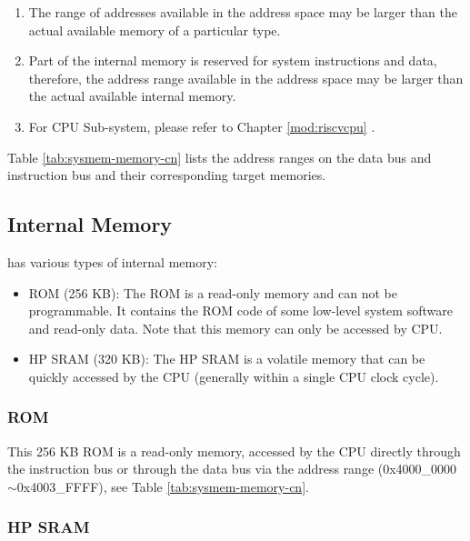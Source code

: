 \documentclass[main\_\_EN.tex]{subfiles}
\begin{document}
\begin{tiplisting}
\vspace{-2em}
\begin{enumerate}
    \item The range of addresses available in the address space may be larger than the actual available memory of a particular type.
    \item Part of the internal memory is reserved for system instructions and data, therefore, the address range available in the address space may be larger than the actual available internal memory.
    \item For CPU Sub-system, please refer to Chapter \ref{mod:riscvcpu} \textit{}.
\end{enumerate}
\end{tiplisting}

Table \ref{tab:sysmem-memory-cn} lists the address ranges on the data bus and instruction bus and their corresponding target memories.




\subsection{Internal Memory}
\label{para:sysmem-internal-memory}

\chipname{} has various types of internal memory:

\begin{itemize}
    \item ROM (256 KB): The ROM is a read-only memory and can not be programmable. It contains the ROM code of some low-level system software and read-only data. Note that this memory can only be accessed by CPU.
    \item HP SRAM (320 KB): The HP SRAM is a volatile memory that can be quickly accessed by the CPU (generally within a single CPU clock cycle).
\end{itemize}

\subsubsection{ROM}
\label{par:rom}

This 256 KB ROM is a read-only memory, accessed by the CPU directly through the instruction bus or through the data bus via the address range (0x4000\_0000$\sim$0x4003\_FFFF), see Table  \ref{tab:sysmem-memory-cn}.

\subsubsection{HP SRAM}
\label{other:sysmem-internal-sram-0}
\end{document}
